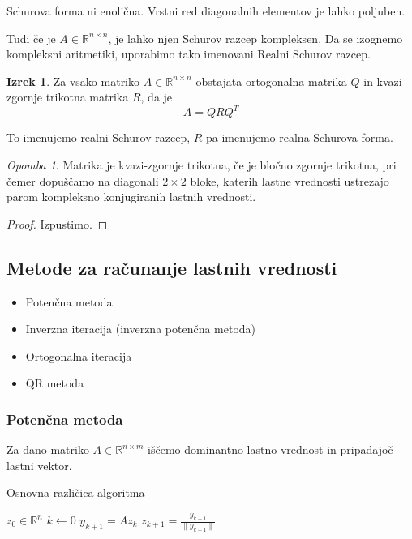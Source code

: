 \documentclass[a4paper,12pt]{article}
\theoremstyle{definition}
\newtheorem{theorem}[counter]{Izrek}
\theoremstyle{remark}
\newtheorem*{rem}{Opomba}
\newcommand{\R}{\mathbb{R}}
\begin{document}
Schurova forma ni enolična. Vrstni red diagonalnih elementov je lahko poljuben.

Tudi če je $A \in \R^{n\times n}$, je lahko njen Schurov razcep kompleksen. Da se izognemo kompleksni aritmetiki, uporabimo tako imenovani Realni Schurov razcep.

\begin{theorem}
    Za vsako matriko $A \in \R^{n\times n}$ obstajata ortogonalna matrika $Q$ in kvazi-zgornje trikotna matrika $R$, da je
    \begin{equation*}
        A = QRQ^T
    \end{equation*}

    To imenujemo realni Schurov razcep, $R$ pa imenujemo realna Schurova forma.
\end{theorem}

\begin{rem}
    Matrika je kvazi-zgornje trikotna, če je bločno zgornje trikotna, pri čemer dopuščamo na diagonali $2 \times 2$ bloke, katerih lastne vrednosti
    ustrezajo parom kompleksno konjugiranih lastnih vrednosti.
\end{rem}

\begin{proof}
    Izpustimo.
\end{proof}

\subsection{Metode za računanje lastnih vrednosti}
\begin{itemize}
    \item Potenčna metoda
    \item Inverzna iteracija (inverzna potenčna metoda)
    \item Ortogonalna iteracija
    \item QR metoda
\end{itemize}

\subsubsection{Potenčna metoda}
Za dano matriko $A \in \R^{n \times m}$ iščemo dominantno lastno vrednost in pripadajoč lastni vektor.


\begin{algorithm}
    \caption{Osnovna različica algoritma}
    \begin{algorithmic}[1]
        \State $z_0 \in \mathbb{R}^n$
        \State $k \gets 0$
            \State $y_{k+1} = A z_k$
            \State $z_{k+1} = \frac{y_{k+1}}{\|y_{k+1}\|}$
        \EndWhile
    \end{algorithmic}
\end{algorithm}
\end{document}
